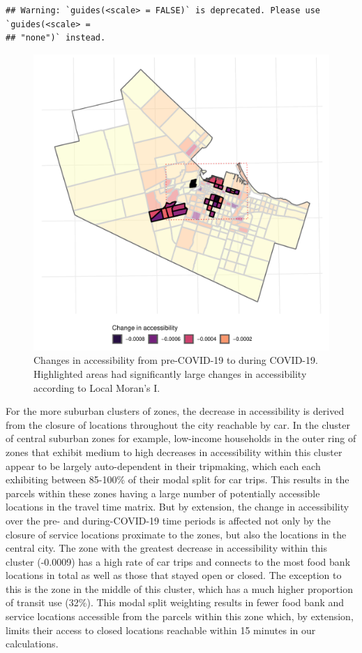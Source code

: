 \documentclass[]{elsarticle} %
\begin{document}
\begin{verbatim}
## Warning: `guides(<scale> = FALSE)` is deprecated. Please use `guides(<scale> =
## "none")` instead.
\end{verbatim}

\begin{figure}
\includegraphics[width=1\linewidth]{Accessibility-Foodbanks-Hamilton-V0_files/figure-latex/plot-local-i-1} \caption{\label{fig:accessibility-changes-with-local-i}Changes in accessibility from pre-COVID-19 to during COVID-19. Highlighted areas had significantly large changes in accessibility according to Local Moran's I.}\label{fig:plot-local-i}
\end{figure}

For the more suburban clusters of zones, the decrease in accessibility
is derived from the closure of locations throughout the city reachable
by car. In the cluster of central suburban zones for example, low-income
households in the outer ring of zones that exhibit medium to high
decreases in accessibility within this cluster appear to be largely
auto-dependent in their tripmaking, which each each exhibiting between
85-100\% of their modal split for car trips. This results in the parcels
within these zones having a large number of potentially accessible
locations in the travel time matrix. But by extension, the change in
accessibility over the pre- and during-COVID-19 time periods is affected
not only by the closure of service locations proximate to the zones, but
also the locations in the central city. The zone with the greatest
decrease in accessibility within this cluster (-0.0009) has a high rate
of car trips and connects to the most food bank locations in total as
well as those that stayed open or closed. The exception to this is the
zone in the middle of this cluster, which has a much higher proportion
of transit use (32\%). This modal split weighting results in fewer food
bank and service locations accessible from the parcels within this zone
which, by extension, limits their access to closed locations reachable
within 15 minutes in our calculations.
\end{document}
